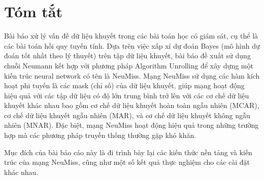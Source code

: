 \section*{Tóm tắt}

Bài báo \cite{le2020neumiss} xử lý vấn đề dữ liệu khuyết trong các bài toán học có giám sát, cụ thể là các bài toán hồi quy tuyến tính.
Dựa trên việc xấp xỉ dự đoán Bayes (mô hình dự đoán tốt nhất theo lý thuyết) trên tập dữ liệu khuyết,
bài báo đề xuất sử dụng chuỗi Neumann kết hợp với phương pháp Algorithm Unrolling \cite{gregor2010unroll} để xây dựng một kiến trúc neural network có tên là NeuMiss. Mạng NeuMiss sử dụng các hàm kích hoạt phi tuyến là các mask (chỉ số) của dữ liệu khuyết, giúp mạng hoạt động hiệu quả với các tập dữ liệu có độ lớn trung bình trở lên với các cơ chế dữ liệu khuyết khác nhau 
bao gồm cơ chế dữ liệu khuyết hoàn toàn ngẫu nhiên (MCAR), cơ chế dữ liệu khuyết ngẫu nhiên (MAR), và cơ chế dữ liệu khuyết không ngẫu nhiên (MNAR).
Đặc biệt, mạng NeuMiss hoạt động hiệu quả trong những trường hợp mà các phương pháp truyền thống thường gặp khó khăn.

Mục đích của bài báo cáo này là đi trình bày lại các kiến thức nền tảng và kiến trúc của mạng NeuMiss, cũng như một số kết quả thực nghiệm cho các cài đặt khác nhau.
